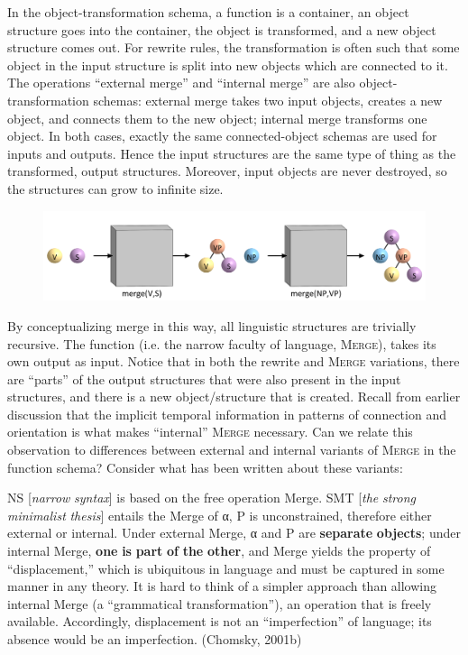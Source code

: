   In the object-transformation schema, a function is a container, an object structure goes into the container, the object is transformed, and a new object structure comes out. For rewrite rules, the transformation is often such that some object in the input structure is split into new objects which are connected to it. The operations “external merge” and “internal merge” are also object-transformation schemas: external merge takes two input objects, creates a new object, and connects them to the new object; internal merge transforms one object. In both cases, exactly the same connected-object schemas are used for inputs and outputs. Hence the input structures are the same type of thing as the transformed, output structures. Moreover, input objects are never destroyed, so the structures can grow to infinite size.

  
\begin{figure}
\includegraphics[width=\textwidth]{figures/Tilsen-img108.png}
\caption{\missingcaption}
\label{fig:}
\end{figure}
 

  By conceptualizing merge in this way, all linguistic structures are trivially recursive. The function (i.e. the narrow faculty of language, \textsc{Merge}), takes its own output as input. Notice that in both the rewrite and \textsc{Merge} variations, there are “parts” of the output structures that were also present in the input structures, and there is a new object/structure that is created. Recall from earlier discussion that the implicit temporal information in patterns of connection and orientation is what makes “internal” \textsc{Merge} necessary. Can we relate this observation to differences between external and internal variants of \textsc{Merge} in the function schema? Consider what has been written about these variants:

NS [\textit{narrow} \textit{syntax}] is based on the free operation Merge. SMT [\textit{the} \textit{strong} \textit{minimalist} \textit{thesis}] entails the Merge of α, P is unconstrained, therefore either external or internal. Under external Merge, α and P are \textbf{separate} \textbf{objects}; under internal Merge, \textbf{one} \textbf{is} \textbf{part} \textbf{of} \textbf{the} \textbf{other}, and Merge yields the property of “displacement,” which is ubiquitous in language and must be captured in some manner in any theory. It is hard to think of a simpler approach than allowing internal Merge (a “grammatical transformation”), an operation that is freely available. Accordingly, displacement is not an “imperfection” of language; its absence would be an imperfection. (Chomsky, 2001b)

